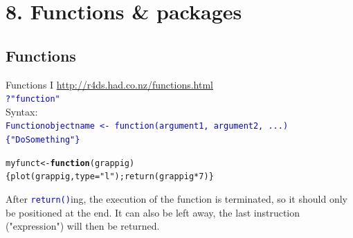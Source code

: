 \documentclass[xcolor=table,       handout,    xcolor=dvipsnames]{beamer}\usepackage[]{graphicx}\usepackage[]{color}
\makeatletter
\newcommand{\hlnum}[1]{\textcolor[rgb]{0,0,0}{#1}}
\newcommand{\hlstr}[1]{\textcolor[rgb]{0.545,0.137,0.137}{#1}}
\newcommand{\hlopt}[1]{\textcolor[rgb]{0,0,0}{#1}}
\newcommand{\hlstd}[1]{\textcolor[rgb]{0,0,0}{#1}}
\newcommand{\hlkwa}[1]{\textcolor[rgb]{1,0,0}{\textbf{#1}}}
\newcommand{\hlkwb}[1]{\textcolor[rgb]{0,0,0}{#1}}
\newcommand{\hlkwc}[1]{\textcolor[rgb]{1,0,1}{#1}}
\newcommand{\hlkwd}[1]{\textcolor[rgb]{0,0,1}{#1}}
\newenvironment{kframe}{%
 \def\at@end@of@kframe{}%
 \ifinner\ifhmode%
  \def\at@end@of@kframe{\end{minipage}}%
  \begin{minipage}{\columnwidth}%
 \fi\fi%
 \def\FrameCommand##1{\hskip\@totalleftmargin \hskip-\fboxsep
 \colorbox{shadecolor}{##1}\hskip-\fboxsep
     \hskip-\linewidth \hskip-\@totalleftmargin \hskip\columnwidth}%
 \MakeFramed {\advance\hsize-\width
   \@totalleftmargin\z@ \linewidth\hsize
   \@setminipage}}%
 {\par\unskip\endMakeFramed%
 \at@end@of@kframe}
\newenvironment{knitrout}{}{} %
\newcommand{\rcode}[1]{\texttt{\textcolor{Blue}{#1}}} %
\makeatother
\begin{document}
\section{8. Functions \& packages}

\subsection{Functions}

\begin{frame}[fragile]{Functions I}
\href{http://r4ds.had.co.nz/functions.html}{http://r4ds.had.co.nz/functions.html}\\
\pause
\rcode{?"function"}\\
\pause  Syntax:\\
\rcode{Functionobjectname <- \alert{function}(argument1, argument2, ...) \{"DoSomething"\}}\\
\pause
\begin{knitrout}
\color{fgcolor}\begin{kframe}
\begin{alltt}
\hlstd{myfunct} \hlkwb{<-} \hlkwa{function}\hlstd{(}\hlkwc{grappig}\hlstd{)}
       \hlstd{\{}\hlkwd{plot}\hlstd{(grappig,} \hlkwc{type}\hlstd{=}\hlstr{"l"}\hlstd{);} \hlkwd{return}\hlstd{(grappig}\hlopt{*}\hlnum{7}\hlstd{)  \}}
\end{alltt}
\end{kframe}
\end{knitrout}
\pause
After \rcode{return()}ing, the execution of the function is terminated, so it should only be positioned at the end. It can also be left away, the last instruction ("expression") will then be returned.
\end{frame}

\end{document}
